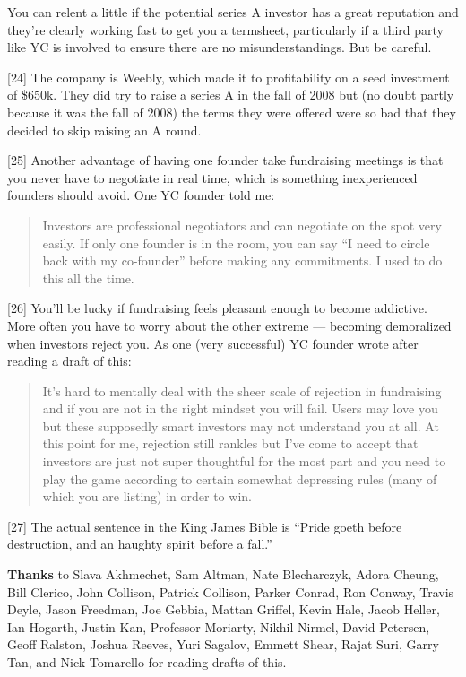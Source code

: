 You can relent a little if the potential series A investor has a great
reputation and they're clearly working fast to get you a termsheet,
particularly if a third party like YC is involved to ensure there are no
misunderstandings. But be careful.

{[}24{]} The company is Weebly, which made it to profitability on a seed
investment of \$650k. They did try to raise a series A in the fall of
2008 but (no doubt partly because it was the fall of 2008) the terms
they were offered were so bad that they decided to skip raising an A
round.

{[}25{]} Another advantage of having one founder take fundraising
meetings is that you never have to negotiate in real time, which is
something inexperienced founders should avoid. One YC founder told me:

\begin{quote}
Investors are professional negotiators and can negotiate on the spot
very easily. If only one founder is in the room, you can say ``I need to
circle back with my co-founder'' before making any commitments. I used
to do this all the time.
\end{quote}

{[}26{]} You'll be lucky if fundraising feels pleasant enough to become
addictive. More often you have to worry about the other extreme ---
becoming demoralized when investors reject you. As one (very successful)
YC founder wrote after reading a draft of this:

\begin{quote}
It's hard to mentally deal with the sheer scale of rejection in
fundraising and if you are not in the right mindset you will fail. Users
may love you but these supposedly smart investors may not understand you
at all. At this point for me, rejection still rankles but I've come to
accept that investors are just not super thoughtful for the most part
and you need to play the game according to certain somewhat depressing
rules (many of which you are listing) in order to win.
\end{quote}

{[}27{]} The actual sentence in the King James Bible is ``Pride goeth
before destruction, and an haughty spirit before a fall.''

\textbf{Thanks} to Slava Akhmechet, Sam Altman, Nate Blecharczyk, Adora
Cheung, Bill Clerico, John Collison, Patrick Collison, Parker Conrad,
Ron Conway, Travis Deyle, Jason Freedman, Joe Gebbia, Mattan Griffel,
Kevin Hale, Jacob Heller, Ian Hogarth, Justin Kan, Professor Moriarty,
Nikhil Nirmel, David Petersen, Geoff Ralston, Joshua Reeves, Yuri
Sagalov, Emmett Shear, Rajat Suri, Garry Tan, and Nick Tomarello for
reading drafts of this.
